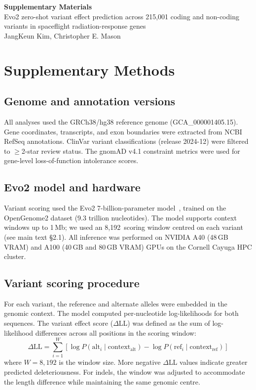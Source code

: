 \documentclass[11pt]{article}
\begin{document}
\begin{center}
  {\LARGE\bfseries Supplementary Materials}\\[1em]
  {\large Evo2 zero-shot variant effect prediction across 215,001 coding
         and non-coding variants in spaceflight radiation-response genes}\\[0.5em]
  {\normalsize JangKeun Kim, Christopher E. Mason}
\end{center}

\vspace{2em}

\tableofcontents

\clearpage

\section{Supplementary Methods}
\label{sec:supp_methods}

\subsection*{Genome and annotation versions}
All analyses used the GRCh38/hg38 reference genome (GCA\_000001405.15). Gene
coordinates, transcripts, and exon boundaries were extracted from NCBI RefSeq
annotations. ClinVar variant classifications (release 2024-12) were filtered to
$\geq$2-star review status. The gnomAD v4.1 constraint metrics were used for
gene-level loss-of-function intolerance scores.

\subsection*{Evo2 model and hardware}
Variant scoring used the Evo2 7-billion-parameter model~\cite{Evo2_2026},
trained on the OpenGenome2 dataset (9.3 trillion nucleotides). The model supports
context windows up to 1\,Mb; we used an 8,192\,\bp{} scoring window centred on
each variant (see main text \S2.1). All inference was performed on NVIDIA A40
(48\,GB VRAM) and A100 (40\,GB and 80\,GB VRAM) GPUs on the Cornell Cayuga HPC
cluster.

\subsection*{Variant scoring procedure}
For each variant, the reference and alternate alleles were embedded in the
genomic context. The model computed per-nucleotide log-likelihoods for both
sequences. The variant effect score ($\Delta$LL) was defined as the sum of
log-likelihood differences across all positions in the scoring window:
\begin{equation}
  \Delta\text{LL} = \sum_{i=1}^{W} \left[\log P(\text{alt}_i \mid \text{context}_\text{alt}) - \log P(\text{ref}_i \mid \text{context}_\text{ref})\right]
  \label{eq:delta_ll}
\end{equation}
where $W = 8{,}192$ is the window size. More negative $\Delta$LL values indicate
greater predicted deleteriousness. For indels, the window was adjusted to
accommodate the length difference while maintaining the same genomic centre.
\end{document}
